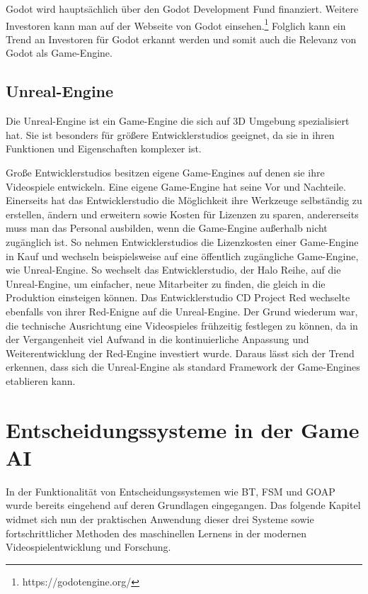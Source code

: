 Godot wird haupts\"{a}chlich \"{u}ber den Godot Development Fund finanziert. Weitere Investoren kann man auf der Webseite von Godot einsehen.\footnote{https://godotengine.org/} Folglich kann ein Trend an Investoren f\"{u}r Godot erkannt werden und somit auch die Relevanz von Godot als Game-Engine.


\subsection{Unreal-Engine}
\label{chap:sota unreal-engine}

Die Unreal-Engine ist ein Game-Engine die sich auf 3D Umgebung spezialisiert hat. Sie ist besonders f\"{u}r gr\"{o}\ss{}ere Entwicklerstudios geeignet, da sie in ihren Funktionen und Eigenschaften komplexer ist. 

Gro\ss{}e Entwicklerstudios besitzen eigene Game-Engines auf denen sie ihre Videospiele entwickeln. Eine eigene Game-Engine hat seine Vor und Nachteile. Einerseits hat das Entwicklerstudio die M\"{o}glichkeit ihre Werkzeuge selbst\"{a}ndig zu erstellen, \"{a}ndern und erweitern sowie Kosten f\"{u}r Lizenzen zu sparen, andererseits muss man das Personal ausbilden, wenn die Game-Engine au\ss{}erhalb nicht zug\"{a}nglich ist. So nehmen Entwicklerstudios die Lizenzkosten einer Game-Engine in Kauf und wechseln beispielsweise auf eine \"{o}ffentlich zug\"{a}ngliche Game-Engine, wie Unreal-Engine. So wechselt das Entwicklerstudio, der Halo Reihe, auf die Unreal-Engine, um einfacher, neue Mitarbeiter zu finden, die gleich in die Produktion einsteigen k\"{o}nnen. \autocite{golem6} Das Entwicklerstudio CD Project Red wechselte ebenfalls von ihrer Red-Enigne auf die Unreal-Engine. Der Grund wiederum war, die technische Ausrichtung eine Videospieles fr\"{u}hzeitig festlegen zu k\"{o}nnen, da in der Vergangenheit viel Aufwand in die kontinuierliche Anpassung und Weiterentwicklung der Red-Engine investiert wurde. \autocite{golem7} Daraus l\"{a}sst sich der Trend erkennen, dass sich die Unreal-Engine als standard Framework der Game-Engines etablieren kann.

\section{Entscheidungssysteme in der Game AI}
\label{chap:sota entscheidungssysteme}

In der Funktionalit\"{a}t von Entscheidungssystemen wie BT, FSM und GOAP wurde bereits eingehend auf deren Grundlagen eingegangen. Das folgende Kapitel widmet sich nun der praktischen Anwendung dieser drei Systeme sowie fortschrittlicher Methoden des maschinellen Lernens in der modernen Videospielentwicklung und Forschung.

